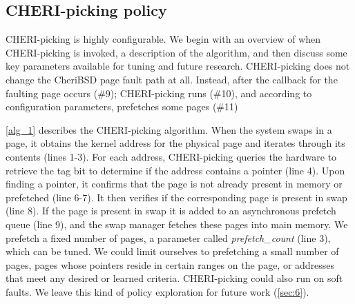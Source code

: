\subsection{CHERI-picking policy} 
\label{sec:DI_CP_Policy}
CHERI-picking is highly configurable. We begin with an overview of when CHERI-picking is invoked, a description of the algorithm, and then discuss some key parameters available for tuning and future research. 
CHERI-picking does not change the CheriBSD page fault path at all.
Instead, after the callback for the faulting page occurs (\#9); CHERI-picking runs (\#10),
and according to configuration parameters, prefetches some pages (\#11)




\autoref{alg_1} describes the CHERI-picking algorithm. When the system swaps in a page, it obtains the kernel address for the physical page and iterates through its contents (lines 1-3). 
For each address, CHERI-picking queries the hardware to retrieve the tag bit to determine if the address contains a pointer (line 4). 
Upon finding a pointer, it confirms that the page is not already present in memory or prefetched (line 6-7). 
It then verifies if the corresponding page is present in swap (line 8). 
If the page is present in swap it is added to an asynchronous prefetch queue (line 9), and the swap manager fetches these pages into main memory. We prefetch a fixed number of pages, a parameter called \textit{prefetch\_count} (line 3), which can be tuned. We could limit ourselves to prefetching a small number of pages, pages whose pointers reside in certain ranges on the page, or addresses that meet any desired or learned criteria. CHERI-picking could also run on soft faults. We leave this kind of policy exploration for future work (\autoref{sec:6}).


